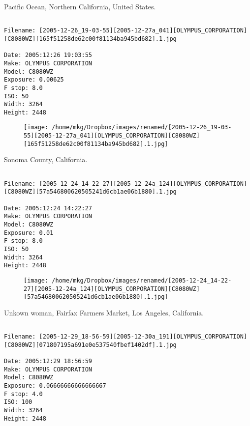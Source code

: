 \clearpage
\onecolumn
\noindent Pacific Ocean, Northern California, United States.
\noindent
\begin{lstlisting}

Filename: [2005-12-26_19-03-55][2005-12-27a_041][OLYMPUS_CORPORATION][C8080WZ][165f51258de62c00f81134ba945bd682].1.jpg

Date: 2005:12:26 19:03:55
Make: OLYMPUS CORPORATION
Model: C8080WZ
Exposure: 0.00625
F stop: 8.0
ISO: 50
Width: 3264
Height: 2448
\end{lstlisting}
\clearpage

\begin{figure}
\texttt{[image: /home/mkg/Dropbox/images/renamed/[2005-12-26\_19-03-55][2005-12-27a\_041][OLYMPUS\_CORPORATION][C8080WZ][165f51258de62c00f81134ba945bd682].1.jpg]}
\end{figure}
    
\clearpage
\onecolumn
\noindent Sonoma County, California.
\noindent
\begin{lstlisting}

Filename: [2005-12-24_14-22-27][2005-12-24a_124][OLYMPUS_CORPORATION][C8080WZ][57a546800620505241d6cb1ae06b1880].1.jpg

Date: 2005:12:24 14:22:27
Make: OLYMPUS CORPORATION
Model: C8080WZ
Exposure: 0.01
F stop: 8.0
ISO: 50
Width: 3264
Height: 2448
\end{lstlisting}
\clearpage

\begin{figure}
\texttt{[image: /home/mkg/Dropbox/images/renamed/[2005-12-24\_14-22-27][2005-12-24a\_124][OLYMPUS\_CORPORATION][C8080WZ][57a546800620505241d6cb1ae06b1880].1.jpg]}
\end{figure}
    
\clearpage
\onecolumn
\noindent Unkown woman, Fairfax Farmers Market, Los Angeles, California.
\noindent
\begin{lstlisting}

Filename: [2005-12-29_18-56-59][2005-12-30a_191][OLYMPUS_CORPORATION][C8080WZ][071807195a691e0e537540fbef1402df].1.jpg

Date: 2005:12:29 18:56:59
Make: OLYMPUS CORPORATION
Model: C8080WZ
Exposure: 0.06666666666666667
F stop: 4.0
ISO: 100
Width: 3264
Height: 2448
\end{lstlisting}
\clearpage

